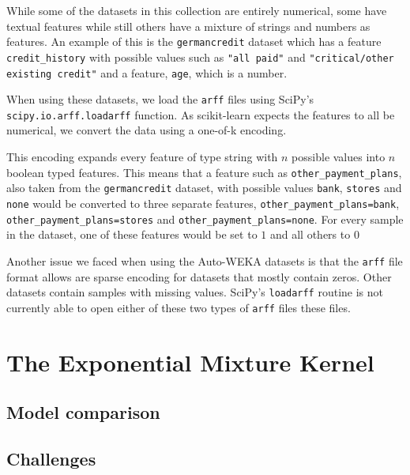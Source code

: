 \documentclass[a4paper,12pt,twoside,openright]{report}
\begin{document}

While some of the datasets in this collection are entirely numerical, some have textual features while still others have a mixture of strings and numbers as features. An example of this is the \texttt{germancredit} dataset which has a feature \texttt{credit\_history} with possible values such as \texttt{"all paid"} and \texttt{"critical/other existing credit"} and a feature,  \texttt{age}, which is a number.

When using these datasets, we load the \texttt{arff} files using SciPy's \texttt{scipy.io.arff.loadarff} function. As scikit-learn expects the features to all be numerical, we convert the data using a one-of-k encoding.

This encoding expands every feature of type string with $n$ possible values into $n$ boolean typed features. This means that a feature such as \texttt{other\_payment\_plans}, also taken from the \texttt{germancredit} dataset, with possible values \texttt{bank}, \texttt{stores} and \texttt{none} would be converted to three separate features, \texttt{other\_payment\_plans=bank}, \texttt{other\_payment\_plans=stores} and \texttt{other\_payment\_plans=none}. For every sample in the dataset, one of these features would be set to $1$ and all others to $0$

Another issue we faced when using the Auto-WEKA datasets is that the \texttt{arff} file format allows are sparse encoding for datasets that mostly contain zeros. Other datasets contain samples with missing values. SciPy's \texttt{loadarff} routine is not currently able to open either of these two types of \texttt{arff} files these files.


\section{The Exponential Mixture Kernel}
\subsection{Model comparison}

\subsection{Challenges}
\end{document}
